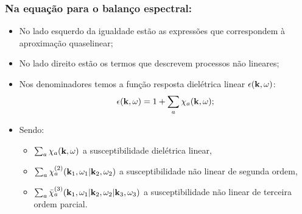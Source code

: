 \documentclass[10pt,aspectratio=1610,lualatex]{beamer}
\begin{document}
\begin{frame}
  \frametitle{Na equação para o balanço espectral:}
  \begin{itemize}
  \item No lado esquerdo da igualdade estão as expressões que
    correspondem  à aproximação quaselinear;
  \item No lado direito estão os termos que descrevem processos
    não lineares;
    \pause
  \item Nos denominadores temos a função resposta dielétrica linear
    $\epsilon({\bf k},\omega)$:
    \begin{equation*}
      \epsilon({\bf k},\omega)=1+\sum_a\chi_a({\bf k},\omega);
    \end{equation*}
  \vspace{-0.4cm}
\item Sendo:
  \begin{itemize}
  \item $\sum_a \chi_a({\bf k},\omega)$ a susceptibilidade dielétrica
    linear,
  \item $\sum_a \chi_a^{(2)}({\bf k}_1,\omega_1|{\bf k}_2,\omega_2)$ a
    susceptibilidade não linear de segunda ordem,
  \item $\sum_a \bar \chi_a^{(3)}({\bf k}_1,\omega_1|{\bf k}_2,\omega_2|{\bf k}_3,\omega_3)$
    a susceptibilidade não linear de terceira ordem parcial.
  \end{itemize}
  \end{itemize}
\end{frame}
\end{document}
